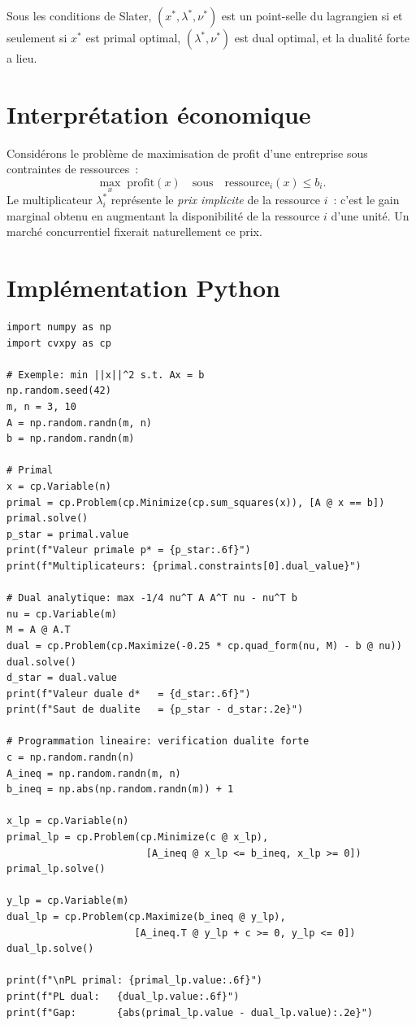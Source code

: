 \begin{theoreme}
Sous les conditions de Slater, $(x^*, \lambda^*, \nu^*)$ est un point-selle du
lagrangien si et seulement si $x^*$ est primal optimal, $(\lambda^*, \nu^*)$ est
dual optimal, et la dualit\'e forte a lieu.
\end{theoreme}

\section{Interpr\'etation \'economique}

\begin{intuition}
Consid\'erons le probl\`eme de maximisation de profit d'une entreprise sous contraintes
de ressources~:
\[
    \max_x \; \mathrm{profit}(x) \quad \text{sous} \quad
    \mathrm{ressource}_i(x) \leq b_i.
\]
Le multiplicateur $\lambda_i^*$ repr\'esente le \emph{prix implicite} de la
ressource $i$~: c'est le gain marginal obtenu en augmentant la disponibilit\'e
de la ressource $i$ d'une unit\'e. Un march\'e concurrentiel fixerait naturellement
ce prix.
\end{intuition}

\section{Impl\'ementation Python}

\begin{codeblock}[title=\textbf{Dualit\'e lagrangienne et saut de dualit\'e}]
\begin{verbatim}
import numpy as np
import cvxpy as cp

# Exemple: min ||x||^2 s.t. Ax = b
np.random.seed(42)
m, n = 3, 10
A = np.random.randn(m, n)
b = np.random.randn(m)

# Primal
x = cp.Variable(n)
primal = cp.Problem(cp.Minimize(cp.sum_squares(x)), [A @ x == b])
primal.solve()
p_star = primal.value
print(f"Valeur primale p* = {p_star:.6f}")
print(f"Multiplicateurs: {primal.constraints[0].dual_value}")

# Dual analytique: max -1/4 nu^T A A^T nu - nu^T b
nu = cp.Variable(m)
M = A @ A.T
dual = cp.Problem(cp.Maximize(-0.25 * cp.quad_form(nu, M) - b @ nu))
dual.solve()
d_star = dual.value
print(f"Valeur duale d*   = {d_star:.6f}")
print(f"Saut de dualite   = {p_star - d_star:.2e}")

# Programmation lineaire: verification dualite forte
c = np.random.randn(n)
A_ineq = np.random.randn(m, n)
b_ineq = np.abs(np.random.randn(m)) + 1

x_lp = cp.Variable(n)
primal_lp = cp.Problem(cp.Minimize(c @ x_lp),
                        [A_ineq @ x_lp <= b_ineq, x_lp >= 0])
primal_lp.solve()

y_lp = cp.Variable(m)
dual_lp = cp.Problem(cp.Maximize(b_ineq @ y_lp),
                      [A_ineq.T @ y_lp + c >= 0, y_lp <= 0])
dual_lp.solve()

print(f"\nPL primal: {primal_lp.value:.6f}")
print(f"PL dual:   {dual_lp.value:.6f}")
print(f"Gap:       {abs(primal_lp.value - dual_lp.value):.2e}")
\end{verbatim}
\end{codeblock}

